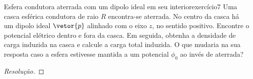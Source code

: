\begin{exercício}{Esfera condutora aterrada com um dipolo ideal em seu interior}{exercício7}
    Uma casca esférica condutora de raio \(R\) encontra-se aterrada. No centro da casca há um dipolo ideal \(\vetor{p}\) alinhado com o eixo \(z\), no sentido positivo. Encontre o potencial elétrico dentro e fora da casca. Em seguida, obtenha a densidade de carga induzida na casca e calcule a carga total induzida. O que mudaria na sua resposta caso a esfera estivesse mantida a um potencial \(\phi_0\) ao invés de aterrada?
\end{exercício}
\begin{proof}[Resolução]

\end{proof}

